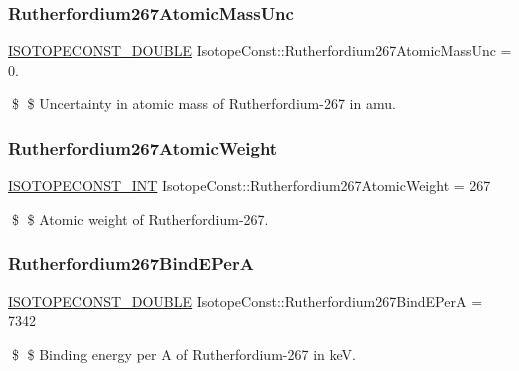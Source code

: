 \subsubsection{\texorpdfstring{Rutherfordium267\+Atomic\+Mass\+Unc}{Rutherfordium267AtomicMassUnc}}
{\footnotesize\ttfamily \mbox{\hyperlink{group___isotope_const-_macros_ga8f45a7272ce02c0b4c65c44636ed719a}{I\+S\+O\+T\+O\+P\+E\+C\+O\+N\+S\+T\+\_\+\+D\+O\+U\+B\+LE}} Isotope\+Const\+::\+Rutherfordium267\+Atomic\+Mass\+Unc = 0.}

\$ \$ Uncertainty in atomic mass of Rutherfordium-\/267 in amu. \mbox{\label{group___isotope_const-_rutherfordium-_rf267_ga5008288ff978cd418dd08e91c6af225e}} 
\subsubsection{\texorpdfstring{Rutherfordium267\+Atomic\+Weight}{Rutherfordium267AtomicWeight}}
{\footnotesize\ttfamily \mbox{\hyperlink{group___isotope_const-_macros_ga5f18360b3e99483a35c32d789e62621c}{I\+S\+O\+T\+O\+P\+E\+C\+O\+N\+S\+T\+\_\+\+I\+NT}} Isotope\+Const\+::\+Rutherfordium267\+Atomic\+Weight = 267}

\$ \$ Atomic weight of Rutherfordium-\/267. \mbox{\label{group___isotope_const-_rutherfordium-_rf267_gac35deeaa97389e9b925264c37c3a93b5}} 
\subsubsection{\texorpdfstring{Rutherfordium267\+Bind\+E\+PerA}{Rutherfordium267BindEPerA}}
{\footnotesize\ttfamily \mbox{\hyperlink{group___isotope_const-_macros_ga8f45a7272ce02c0b4c65c44636ed719a}{I\+S\+O\+T\+O\+P\+E\+C\+O\+N\+S\+T\+\_\+\+D\+O\+U\+B\+LE}} Isotope\+Const\+::\+Rutherfordium267\+Bind\+E\+PerA = 7342}

\$ \$ Binding energy per A of Rutherfordium-\/267 in keV. \mbox{\label{group___isotope_const-_rutherfordium-_rf267_ga583a51b9003245b13e8ce1a9c75cfb68}} 
